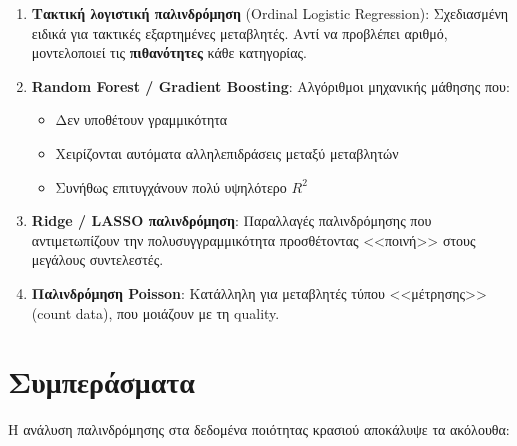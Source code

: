 \documentclass[12pt,a4paper]{article}
\begin{document}
\begin{theorybox}
\begin{enumerate}
    \item \textbf{Τακτική λογιστική παλινδρόμηση} (Ordinal Logistic Regression): Σχεδιασμένη ειδικά για τακτικές εξαρτημένες μεταβλητές. Αντί να προβλέπει αριθμό, μοντελοποιεί τις \textbf{πιθανότητες} κάθε κατηγορίας.

    \item \textbf{Random Forest / Gradient Boosting}: Αλγόριθμοι μηχανικής μάθησης που:
    \begin{itemize}
        \item Δεν υποθέτουν γραμμικότητα
        \item Χειρίζονται αυτόματα αλληλεπιδράσεις μεταξύ μεταβλητών
        \item Συνήθως επιτυγχάνουν πολύ υψηλότερο $R^2$
    \end{itemize}

    \item \textbf{Ridge / LASSO παλινδρόμηση}: Παραλλαγές παλινδρόμησης που αντιμετωπίζουν την πολυσυγγραμμικότητα προσθέτοντας <<ποινή>> στους μεγάλους συντελεστές.

    \item \textbf{Παλινδρόμηση Poisson}: Κατάλληλη για μεταβλητές τύπου <<μέτρησης>> (count data), που μοιάζουν με τη quality.
\end{enumerate}
\end{theorybox}

\newpage
\section{Συμπεράσματα}

Η ανάλυση παλινδρόμησης στα δεδομένα ποιότητας κρασιού αποκάλυψε τα ακόλουθα:
\end{document}
